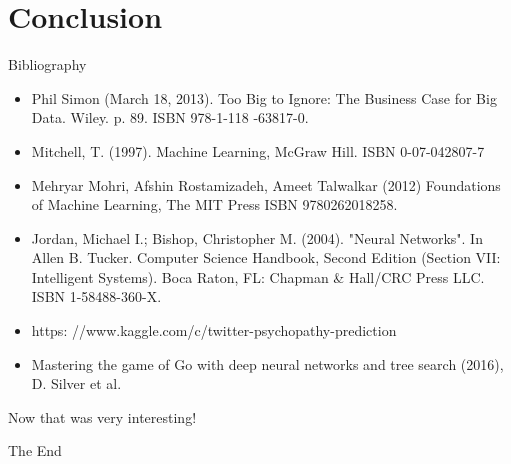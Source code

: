 \documentclass[10pt]{beamer}
\begin{document}
	
	
	\section{Conclusion}
	\begin{frame}{Bibliography}
		\twocolumn
		\begin{itemize}
			\item \scriptsize{Phil Simon (March 18, 2013). Too Big to Ignore: The Business Case for Big Data. Wiley. p. 89. ISBN 978-1-118
				-63817-0.}
			\item \scriptsize{Mitchell, T. (1997). Machine Learning, McGraw Hill. ISBN 0-07-042807-7}
			\item \scriptsize{ Mehryar Mohri, Afshin Rostamizadeh, Ameet Talwalkar (2012) Foundations of Machine Learning, The MIT Press ISBN 9780262018258.}
			\item \scriptsize{Jordan, Michael I.; Bishop, Christopher M. (2004). "Neural Networks". In Allen B. Tucker. Computer Science Handbook, Second Edition (Section VII: Intelligent Systems). Boca Raton, FL: Chapman \& Hall/CRC Press LLC. ISBN 1-58488-360-X.}
			\item \scriptsize{https: //www.kaggle.com/c/twitter-psychopathy-prediction}
			\item \scriptsize{Mastering the game of Go with deep neural networks and tree search (2016), D. Silver et al.}
		\end{itemize}
		\onecolumn
	\end{frame}
	\endgroup
	
	\begingroup
	\begin{frame}[plain,c]
		\hspace*{6 mm}
		\vspace*{-18 mm}
		\textcolor{blue_light}{\Large{Now that was very interesting!}}
	\end{frame}
	\begin{frame}[plain,c]
		\hspace*{27 mm}
		\vspace*{-20 mm}
		\textcolor{blue_light}{\Large{The End}}
	\end{frame}
	\endgroup
	
\end{document}
